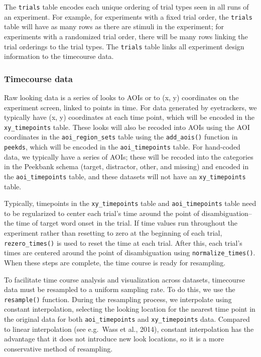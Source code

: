 \documentclass[
  english,
  man,floatsintext]{apa6}
\begin{document}
The \texttt{trials} table encodes each unique ordering of trial types seen in all runs of an experiment.
For example, for experiments with a fixed trial order, the \texttt{trials} table will have as many rows as there are stimuli in the experiment; for experiments with a randomized trial order, there will be many rows linking the trial orderings to the trial types.
The \texttt{trials} table links all experiment design information to the timecourse data.

\hypertarget{timecourse-data-1}{%
\subsubsection{Timecourse data}\label{timecourse-data-1}}

Raw looking data is a series of looks to AOIs or to (x, y) coordinates on the experiment screen, linked to points in time.
For data generated by eyetrackers, we typically have (x, y) coordinates at each time point, which will be encoded in the \texttt{xy\_timepoints} table.
These looks will also be recoded into AOIs using the AOI coordinates in the \texttt{aoi\_region\_sets} table using the \texttt{add\_aois()} function in \texttt{peekds}, which will be encoded in the \texttt{aoi\_timepoints} table.
For hand-coded data, we typically have a series of AOIs; these will be recoded into the categories in the Peekbank schema (target, distractor, other, and missing) and encoded in the \texttt{aoi\_timepoints} table, and these datasets will not have an \texttt{xy\_timepoints} table.

Typically, timepoints in the \texttt{xy\_timepoints} table and \texttt{aoi\_timepoints} table need to be regularized to center each trial's time around the point of disambiguation--the time of target word onset in the trial.
If time values run throughout the experiment rather than resetting to zero at the beginning of each trial, \texttt{rezero\_times()} is used to reset the time at each trial.
After this, each trial's times are centered around the point of disambiguation using \texttt{normalize\_times()}.
When these steps are complete, the time course is ready for resampling.

To facilitate time course analysis and visualization across datasets, timecourse data must be resampled to a uniform sampling rate.
To do this, we use the \texttt{resample()} function.
During the resampling process, we interpolate using constant interpolation, selecting the looking location for the nearest time point in the original data for both \texttt{aoi\_timepoints} and \texttt{xy\_timepoints} data.
Compared to linear interpolation (see e.g.~Wass et al., 2014), constant interpolation has the advantage that it does not introduce new look locations, so it is a more conservative method of resampling.
\end{document}

